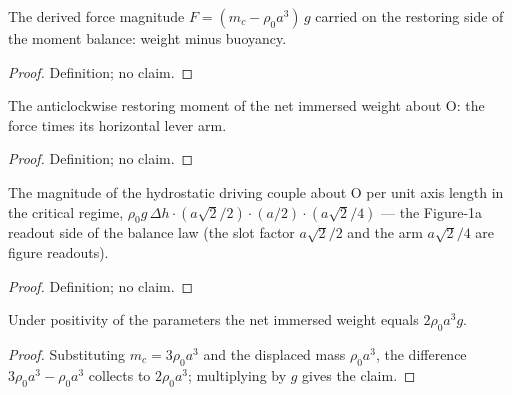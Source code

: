 \begin{definition}
\label{def:IPhO2026Problems_problem_IPhO_2026_1_A_1:netImmersedWeight}
The derived force magnitude $F = (m_c - \rho_0 a^3)\, g$ carried on the
restoring side of the moment balance: weight minus buoyancy.
\end{definition}
\begin{proof}
Definition; no claim.
\end{proof}

\begin{definition}
\label{def:IPhO2026Problems_problem_IPhO_2026_1_A_1:restoringMoment}
The anticlockwise restoring moment of the net immersed weight about O: the
force times its horizontal lever arm.
\end{definition}
\begin{proof}
Definition; no claim.
\end{proof}

\begin{definition}
\label{def:IPhO2026Problems_problem_IPhO_2026_1_A_1:pressureCoupleMagnitude}
The magnitude of the hydrostatic driving couple about O per unit axis length
in the critical regime,
$\rho_0 g\, \Delta h \cdot (a\sqrt{2}/2) \cdot (a/2) \cdot (a\sqrt{2}/4)$ —
the Figure-1a readout side of the balance law (the slot factor $a\sqrt{2}/2$
and the arm $a\sqrt{2}/4$ are figure readouts).
\end{definition}
\begin{proof}
Definition; no claim.
\end{proof}

\begin{lemma}
\label{lem:IPhO2026Problems_problem_IPhO_2026_1_A_1:net_immersed_weight_eq}
Under positivity of the parameters the net immersed weight equals
$2\rho_0 a^3 g$.
\end{lemma}
\begin{proof}
Substituting $m_c = 3\rho_0 a^3$ and the displaced mass $\rho_0 a^3$, the
difference $3\rho_0 a^3 - \rho_0 a^3$ collects to $2\rho_0 a^3$; multiplying
by $g$ gives the claim.
\end{proof}


